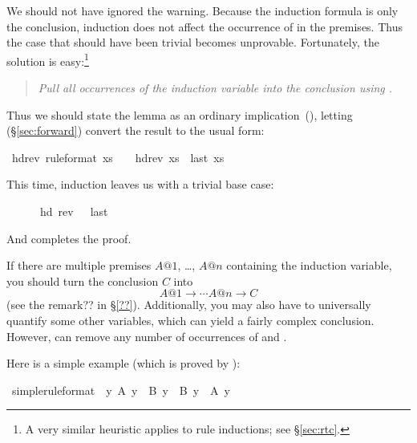 \begin{isabellebody}
\begin{isamarkuptxt}
We should not have ignored the warning. Because the induction
formula is only the conclusion, induction does not affect the occurrence of  in the premises.  
Thus the case that should have been trivial
becomes unprovable. Fortunately, the solution is easy:\footnote{A very similar
heuristic applies to rule inductions; see \S\ref{sec:rtc}.}
\begin{quote}
\emph{Pull all occurrences of the induction variable into the conclusion
using \isa{{\isasymlongrightarrow}}.}
\end{quote}
Thus we should state the lemma as an ordinary 
implication~(\isa{{\isasymlongrightarrow}}), letting
 (\S\ref{sec:forward}) convert the
result to the usual \isa{{\isasymLongrightarrow}} form:%
\end{isamarkuptxt}%
\ hd{\isacharunderscore}rev\ {\isacharbrackleft}rule{\isacharunderscore}format{\isacharbrackright}{\isacharcolon}\ {\isachardoublequote}xs\ {\isasymnoteq}\ {\isacharbrackleft}{\isacharbrackright}\ {\isasymlongrightarrow}\ hd{\isacharparenleft}rev\ xs{\isacharparenright}\ {\isacharequal}\ last\ xs{\isachardoublequote}%
\begin{isamarkuptxt}%
\noindent
This time, induction leaves us with a trivial base case:
\begin{isabelle}%
\ {}{\isachardot}\ {\isacharbrackleft}{\isacharbrackright}\ {\isasymnoteq}\ {\isacharbrackleft}{\isacharbrackright}\ {\isasymlongrightarrow}\ hd\ {\isacharparenleft}rev\ {\isacharbrackleft}{\isacharbrackright}{\isacharparenright}\ {\isacharequal}\ last\ {\isacharbrackleft}{\isacharbrackright}%
\end{isabelle}
And  completes the proof.%
\end{isamarkuptxt}%
%
\begin{isamarkuptext}%
If there are multiple premises $A@1$, \dots, $A@n$ containing the
induction variable, you should turn the conclusion $C$ into
\[ A@1 \longrightarrow \cdots A@n \longrightarrow C \]
(see the remark?? in \S\ref{??}).
Additionally, you may also have to universally quantify some other variables,
which can yield a fairly complex conclusion.  However,  
can remove any number of occurrences of \isa{{\isasymforall}} and
\isa{{\isasymlongrightarrow}}.

Here is a simple example (which is proved by ):%
\end{isamarkuptext}%
\ simple{\isacharbrackleft}rule{\isacharunderscore}format{\isacharbrackright}{\isacharcolon}\ \ {\isachardoublequote}{\isasymforall}y{\isachardot}\ A\ y\ {\isasymlongrightarrow}\ B\ y\ {\isasymlongrightarrow}\ B\ y\ {\isasymand}\ A\ y{\isachardoublequote}%
\begin{isamarkuptext}%
\medskip


\end{isamarkuptext}
\end{isabellebody}
